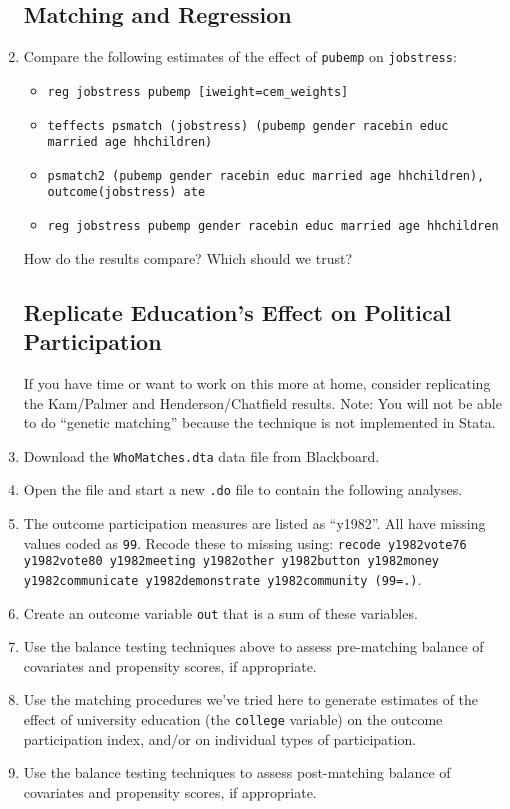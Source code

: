 \documentclass[a4paper,12pt]{article}
\begin{document}
\begin{enumerate}
\subsection*{Matching and Regression}
\item Compare the following estimates of the effect of \texttt{pubemp} on \texttt{jobstress}:
	\begin{itemize}
	\item \texttt{reg jobstress pubemp [iweight=cem\_weights]}
	\item \texttt{teffects psmatch (jobstress) (pubemp gender racebin educ married age hhchildren)}
	\item \texttt{psmatch2 (pubemp gender racebin educ married age hhchildren), outcome(jobstress) ate}
	\item \texttt{reg jobstress pubemp gender racebin educ married age hhchildren}
	\end{itemize}
How do the results compare? Which should we trust?

\subsection*{Replicate Education's Effect on Political Participation}

If you have time or want to work on this more at home, consider replicating the Kam/Palmer and Henderson/Chatfield results. Note: You will not be able to do ``genetic matching'' because the technique is not implemented in Stata.

\item Download the \texttt{WhoMatches.dta} data file from Blackboard.
\item Open the file and start a new \texttt{.do} file to contain the following analyses.
\item The outcome participation measures are listed as ``y1982''. All have missing values coded as \texttt{99}. Recode these to missing using: \texttt{recode y1982vote76 y1982vote80 y1982meeting y1982other y1982button y1982money y1982communicate y1982demonstrate y1982community (99=.)}.
\item Create an outcome variable \texttt{out} that is a sum of these variables.

\item Use the balance testing techniques above to assess pre-matching balance of covariates and propensity scores, if appropriate.
\item Use the matching procedures we've tried here to generate estimates of the effect of university education (the \texttt{college} variable) on the outcome participation index, and/or on individual types of participation.
\item Use the balance testing techniques to assess post-matching balance of covariates and propensity scores, if appropriate.

\end{enumerate}
\end{document}
